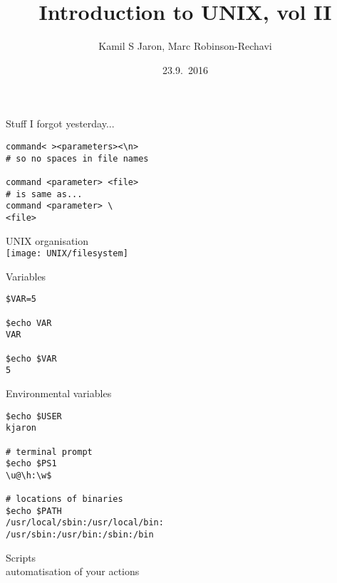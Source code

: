 \documentclass[xcolor=dvipsnames]{beamer}
\title[ ]{Introduction to UNIX, vol II}
\author{Kamil S Jaron, Marc Robinson-Rechavi}
\date{23.9.~2016}
\begin{document}
\begin{frame}
	\titlepage
\end{frame}

\begin{frame}[fragile]
	\begin{center}
		\huge
		Stuff I forgot yesterday...
	\end{center}
\LARGE
\begin{verbatim}
command< ><parameters><\n>
# so no spaces in file names

command <parameter> <file>
# is same as...
command <parameter> \
<file>
\end{verbatim}
\end{frame}

\begin{frame}
	\begin{center}
		\Huge
		UNIX organisation \\
		\vspace{1cm}
		\texttt{[image: UNIX/filesystem]}
	\end{center}
\end{frame}

\begin{frame}[fragile]
	\begin{center}
		\Huge
		Variables
	\end{center}
\huge
\begin{verbatim}
$VAR=5

$echo VAR
VAR

$echo $VAR
5
\end{verbatim}
\end{frame}

\begin{frame}[fragile]
	\begin{center}
		\Huge
		Environmental variables
	\end{center}
\Large
\begin{verbatim}
$echo $USER
kjaron

# terminal prompt
$echo $PS1
\u@\h:\w$

# locations of binaries
$echo $PATH
/usr/local/sbin:/usr/local/bin:
/usr/sbin:/usr/bin:/sbin:/bin

\end{verbatim}
\end{frame}

\begin{frame}[fragile]
	\begin{center}
		\Huge
		Scripts \\
		\Large 
		automatisation of your actions
	\end{center}
\end{frame}
\end{document}
